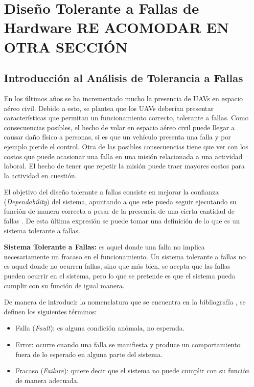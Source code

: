 \section{Diseño Tolerante a Fallas de Hardware RE ACOMODAR EN OTRA SECCIÓN}

\subsection{Introducción al Análisis de Tolerancia a Fallas}\label{subsec:introduccion_al_analisis_de_tolerancia_a_fallas}

En los últimos años se ha incrementado mucho la presencia de UAVs en espacio aéreo civil. Debido a esto, se plantea que los UAVs deberían presentar características que permitan un funcionamiento correcto, tolerante a fallas. Como consecuencias posibles, el hecho de volar en espacio aéreo civil puede llegar a causar daño físico a personas, si es que un vehículo presenta una falla y por ejemplo pierde el control. Otra de las posibles consecuencias tiene que ver con los costos que puede ocasionar una falla en una misión relacionada a una actividad laboral. El hecho de tener que repetir la misión puede traer mayores costos para la actividad en cuestión.

El objetivo del diseño tolerante a fallas consiste en mejorar la confianza (\textit{Dependability}) del sistema, apuntando a que este pueda seguir ejecutando su función de manera correcta a pesar de la presencia de una cierta cantidad de fallas \cite{nelson1990fault}. De esta última expresión se puede tomar una definición de lo que es un sistema tolerante a fallas.

\begin{mydef}
    \textbf{Sistema Tolerante a Fallas:} es aquel donde una falla no implica necesariamente un fracaso en el funcionamiento. Un sistema tolerante a fallas no es aquel donde no ocurren fallas, sino que más bien, se acepta que las fallas pueden ocurrir en el sistema, pero lo que se pretende es que el sistema pueda cumplir con su función de igual manera.
\end{mydef}

De manera de introducir la nomenclatura que se encuentra en la bibliografía \cite{nelson1990fault}, se definen los siguientes términos:

\begin{itemize}
    \item Falla (\textit{Fault}): es alguna condición anómala, no esperada.
    \item Error: ocurre cuando una falla se manifiesta y produce un comportamiento fuera de lo esperado en alguna parte del sistema.
    \item Fracaso (\textit{Failure}): quiere decir que el sistema no puede cumplir con su función de manera adecuada.
\end{itemize}


